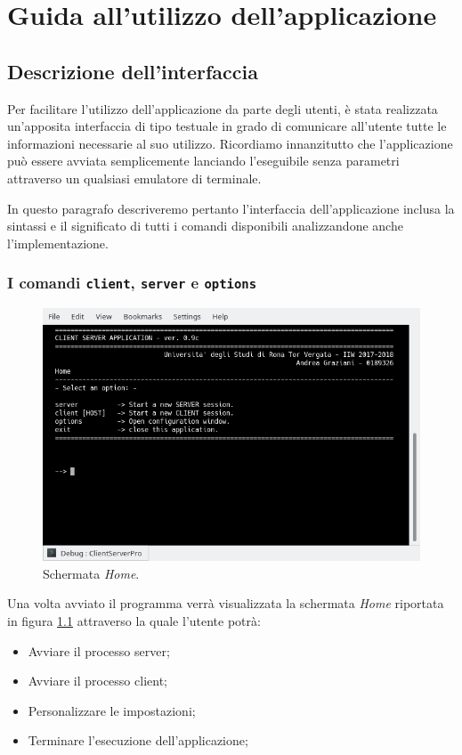\documentclass[10pt,a4paper, titlepage]{report}
\begin{document}
\newpage
\chapter{Guida all'utilizzo dell'applicazione}

\section{Descrizione dell'interfaccia}

Per facilitare l'utilizzo dell'applicazione da parte degli utenti, è stata realizzata un'apposita interfaccia di tipo testuale in grado di comunicare all'utente tutte le informazioni necessarie al suo utilizzo. Ricordiamo innanzitutto che l'applicazione può essere avviata semplicemente lanciando l'eseguibile senza parametri attraverso un qualsiasi emulatore di terminale. 

In questo paragrafo descriveremo pertanto l'interfaccia dell'applicazione inclusa la sintassi e il significato di tutti i comandi disponibili analizzandone anche l'implementazione.

\subsection{I comandi \texttt{client}, \texttt{server} e \texttt{options}}

\begin{figure}
\centering
\includegraphics[width=\textwidth]{Home}
\caption{Schermata \textit{Home}.}
\label{fig:home}
\end{figure}

Una volta avviato il programma verrà visualizzata la schermata \textit{Home} riportata in figura \ref{fig:home} attraverso la quale l'utente potrà:
\begin{itemize}
\item Avviare il processo server;
\item Avviare il processo client;
\item Personalizzare le impostazioni;
\item Terminare l'esecuzione dell'applicazione;
\end{itemize}
\end{document}
